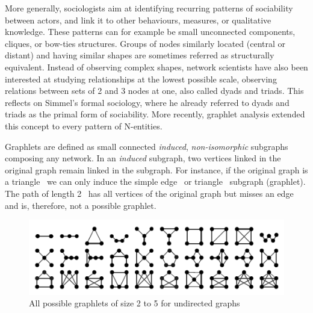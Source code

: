More generally, sociologists aim at identifying recurring patterns of sociability between actors, and link it to other behaviours, measures, or qualitative knowledge.
These patterns can for example be small unconnected components, cliques, or bow-ties structures.
Groups of nodes similarly located (central or distant) and having similar shapes are sometimes referred as structurally equivalent\cite{lemercier12FormalNetwork2015}.
Instead of observing complex shapes, network scientists have also been interested at studying relationships at the lowest possible scale, \ie observing relations between sets of 2 and 3 nodes at one, also called dyads and triads\cite{wassermanSocialNetworkAnalysis1994}.
This reflects on Simmel's formal sociology, where he already referred to dyads and triads as the primal form of sociability\cite{Simmel2013}.
More recently, graphlet analysis extended this concept to every pattern of N-entities\cite{pržuljBiologicalNetworkComparison2007}.

Graphlets are defined as small connected \emph{induced}, \emph{non-isomorphic} subgraphs composing any network\cite{miloNetworkMotifsSimple2002}.
In an \emph{induced} subgraph, two vertices linked in the original graph remain linked in the subgraph.
For instance, if the original graph is a triangle \TRIANGLE\ we can only induce the simple edge \EDGE\ or triangle \TRIANGLE\ subgraph (graphlet).
The path of length 2 \PATH\ has all vertices of the original graph but misses an edge and is, therefore, not a possible graphlet.



\begin{figure}
    \centering %
    \includegraphics[width=1\textwidth]{static/figures/RelatedWork/all_graphlets_undir5}
    \caption{All possible graphlets of size 2 to 5 for undirected graphs}
    \label{fig:undir5-graphlets}
\end{figure}

